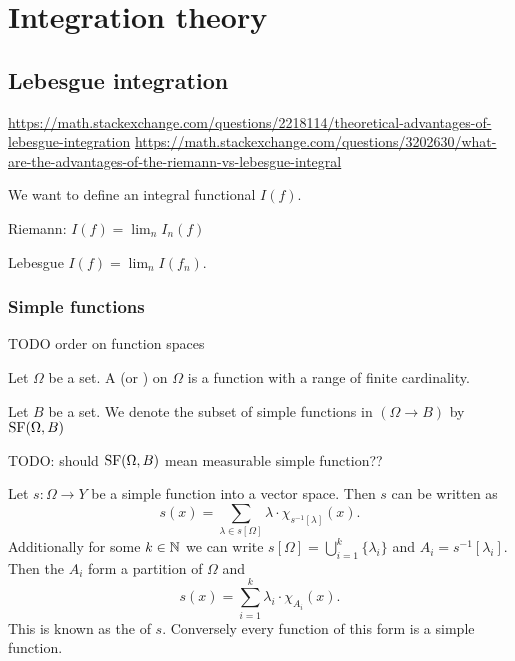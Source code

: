 \chapter{Integration theory}

\section{Lebesgue integration}
\url{https://math.stackexchange.com/questions/2218114/theoretical-advantages-of-lebesgue-integration}
\url{https://math.stackexchange.com/questions/3202630/what-are-the-advantages-of-the-riemann-vs-lebesgue-integral}

We want to define an integral functional $I(f)$.

Riemann: $I(f) = \lim_n I_n(f)$

Lebesgue $I(f) = \lim_n I(f_n)$.


\subsection{Simple functions}
TODO order on function spaces

\begin{definition}
Let $\Omega$ be a set. A  (or ) on $\Omega$ is a function with a range of finite cardinality.

Let $B$ be a set. We denote the subset of simple functions in $(\Omega\to B)$ by $\operatorname{SF}(\Omega,B)$
\end{definition}

TODO: should $\operatorname{SF}(\Omega, B)$ mean measurable simple function??

\begin{lemma}
Let $s:\Omega\to Y$ be a simple function into a vector space. Then $s$ can be written as
\[ s(x) = \sum_{\lambda \in s[\Omega]}\lambda\cdot \chi_{s^{-1}[\lambda]}(x). \]
Additionally for some $k\in\mathbb{N}$ we can write $s[\Omega] = \bigcup_{i=1}^k\{\lambda_i\}$ and $A_i = s^{-1}[\lambda_i]$. Then the $A_i$ form a partition of $\Omega$ and
\[ s(x) = \sum_{i=1}^k\lambda_i\cdot \chi_{A_i}(x). \]
This is known as the  of $s$. Conversely every function of this form is a simple function.
\end{lemma}


